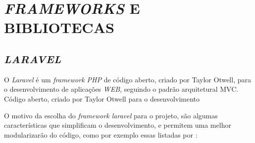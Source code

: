 \section{\textit{FRAMEWORKS} E BIBLIOTECAS}

\subsection{\textit{LARAVEL}}
\label{sec:laravel}

O \textit{Laravel} é um \textit{framework PHP} de código aberto, criado por Taylor Otwell, para o desenvolvimento de aplicações \textit{WEB}, seguindo o padrão arquitetural \ac{MVC}.
Código aberto, criado por Taylor Otwell para o desenvolvimento

O motivo da escolha do \textit{framework laravel} para o projeto, são algumas características que simplificam o desenvolvimento, e permitem uma melhor modularizarão do código, como por exemplo essas listadas por :
